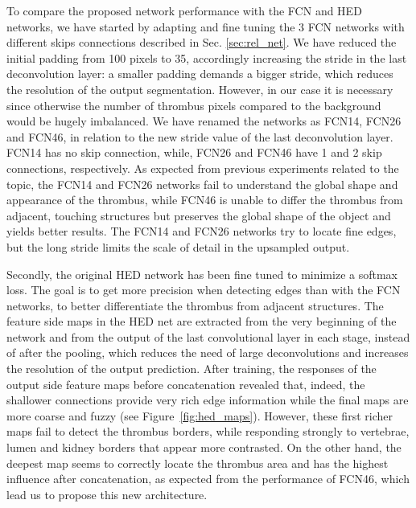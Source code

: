 \documentclass[preprint,authoryear,12pt]{elsarticle}
\begin{document}

To compare the proposed network performance with the FCN and HED networks, we have started by adapting and fine tuning the 3 FCN networks with different skips connections described in Sec. \ref{sec:rel_net}. We have reduced the initial padding from 100 pixels to 35, accordingly increasing the stride in the last deconvolution layer: a smaller padding demands a bigger stride, which reduces the resolution of the output segmentation. However, in our case it is necessary since otherwise the number of thrombus pixels compared to the background would be hugely imbalanced. We have renamed the networks as FCN14, FCN26 and FCN46, in relation to the new stride value of the last deconvolution layer. FCN14 has no skip connection, while, FCN26 and FCN46 have 1 and 2 skip connections, respectively.
As expected from previous experiments related to the topic, the FCN14 and FCN26 networks fail to understand the global shape and appearance of the thrombus, while FCN46 is unable to differ the thrombus from adjacent, touching structures but preserves the global shape of the object and yields better results. The FCN14 and FCN26 networks try to locate fine edges, but the long stride limits the scale of detail in the upsampled output. 

Secondly, the original HED network has been fine tuned to minimize a softmax loss. The goal is to get more precision when detecting edges than with the FCN networks, to better differentiate the thrombus from adjacent structures. The feature side maps in the HED net are extracted from the very beginning of the network and from the output of the last convolutional layer in each stage, instead of after the pooling, which reduces the need of large deconvolutions and increases the resolution of the output prediction. After training, the responses of the output side feature maps before concatenation revealed that, indeed, the shallower connections provide very rich edge information while the final maps are more coarse and fuzzy (see Figure~\ref{fig:hed_maps}). However, these first richer maps fail to detect the thrombus borders, while responding strongly to vertebrae, lumen and kidney borders that appear more contrasted. On the other hand, the deepest map seems to correctly locate the thrombus area and has the highest influence after concatenation, as expected from the performance of FCN46, which lead us to propose this new architecture. \par
\end{document}
